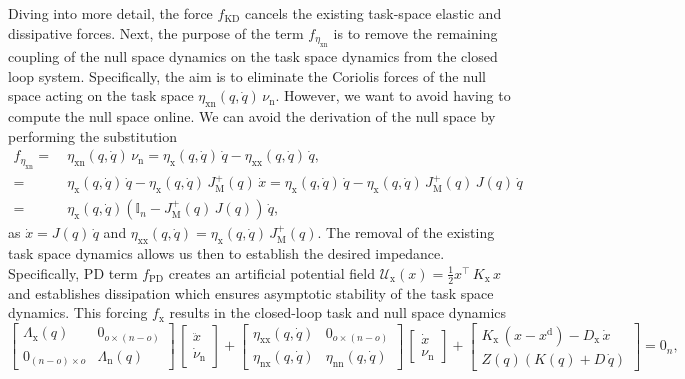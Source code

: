 Diving into more detail, the force $f_\mathrm{KD}$ cancels the existing task-space elastic and dissipative forces.
Next, the purpose of the term $f_{\eta_\mathrm{xn}}$ is to remove the remaining coupling of the null space dynamics on the task space dynamics from the closed loop system. Specifically, the aim is to eliminate the Coriolis forces of the null space acting on the task space $\eta_\mathrm{xn}(q,\dot{q}) \, \nu_\mathrm{n}$. However, we want to avoid having to compute the null space online. We can avoid the derivation of the null space by performing the substitution~\citep{ott2008cartesian, della2020model}
\begin{equation}
\begin{split}
    f_{\eta_\mathrm{xn}} =& \: \eta_\mathrm{xn}(q,\dot{q}) \, \nu_\mathrm{n} = \eta_\mathrm{x}(q,\dot{q}) \, \dot{q} - \eta_\mathrm{xx}(q,\dot{q}) \, \dot{q},\\
    =& \: \eta_\mathrm{x}(q,\dot{q}) \, \dot{q} - \eta_\mathrm{x}(q,\dot{q}) \, J_\mathrm{M}^+(q) \, \dot{x} = \eta_\mathrm{x}(q,\dot{q}) \, \dot{q} - \eta_\mathrm{x}(q,\dot{q}) \, J_\mathrm{M}^+(q) \, J(q) \, \dot{q}\\
    =& \: \eta_\mathrm{x}(q,\dot{q}) \left ( \mathbb{I}_n - J_\mathrm{M}^{+}(q) \, J(q)  \right ) \, \dot{q},
\end{split}
\end{equation}
as $\dot{x} = J(q) \, \dot{q}$ and $\eta_\mathrm{xx}(q,\dot{q}) = \eta_\mathrm{x}(q,\dot{q}) \, J_\mathrm{M}^+(q)$.
The removal of the existing task space dynamics allows us then to establish the desired impedance. Specifically, PD term $f_\mathrm{PD}$ creates an artificial potential field $\mathcal{U}_\mathrm{x}(x) = \frac{1}{2}x^\top \, K_\mathrm{x} \, x$ and establishes dissipation which ensures asymptotic stability of the task space dynamics.
This forcing $f_\mathrm{x}$ results in the closed-loop task and null space dynamics
\begin{equation}
    \begin{bmatrix}
        \Lambda_\mathrm{x}(q) & 0_{o \times (n-o)}\\
        0_{(n-o) \times o} & \Lambda_\mathrm{n}(q)
    \end{bmatrix} \, \begin{bmatrix}
        \ddot{x}\\
        \dot{\nu}_\mathrm{n}
    \end{bmatrix} + \begin{bmatrix}
        \eta_\mathrm{xx}(q,\dot{q}) & 0_{o \times (n-o)}\\
        \eta_\mathrm{nx}(q,\dot{q}) & \eta_\mathrm{nn}(q,\dot{q})
    \end{bmatrix} \, \begin{bmatrix}
        \dot{x}\\ \nu_\mathrm{n}
    \end{bmatrix} + \begin{bmatrix}
        K_\mathrm{x} \, (x - x^\mathrm{d}) - D_\mathrm{x} \, \dot{x}\\
        Z(q) \left ( K(q) + D \, \dot{q} \right )
    \end{bmatrix} = 0_{n},
\end{equation}
